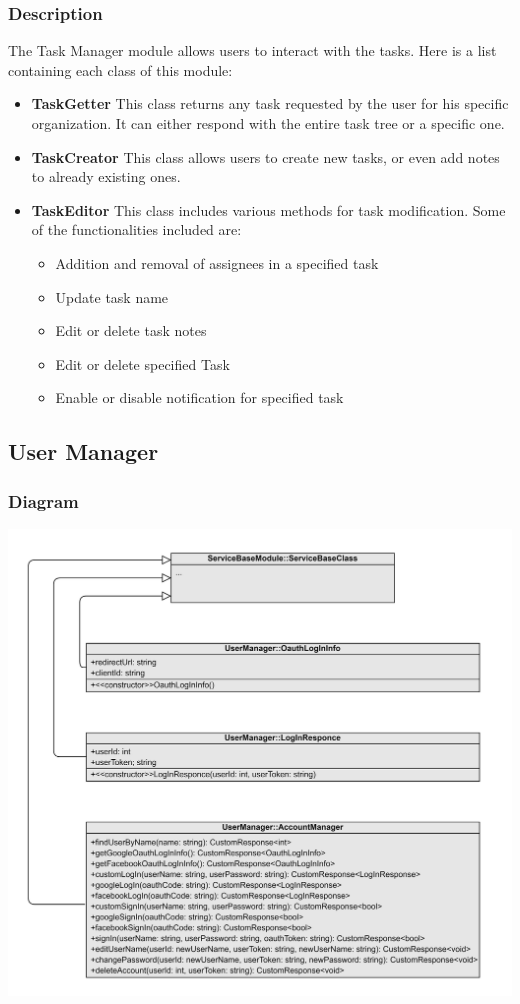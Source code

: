 \documentclass{article}
\begin{document}
\subsubsection{Description}
The Task Manager module allows users to interact with the tasks. Here is a list containing each class of this module:
\begin{itemize}
    \item \textbf{TaskGetter}
    This class returns any task requested by the user for his specific organization. It can either respond with the entire task tree or a specific one.
    \item \textbf{TaskCreator}
    This class allows users to create new tasks, or even add notes to already existing ones.
    \item \textbf{TaskEditor}
    This class includes various methods for task modification. Some of the functionalities included are:
    \begin{itemize}
        \item Addition and removal of assignees in a specified task
        \item Update task name
        \item Edit or delete task notes
        \item Edit or delete specified Task
        \item Enable or disable notification for specified task
    \end{itemize}
\end{itemize}
\subsection{User Manager}

\subsubsection{Diagram}

\includegraphics[width=\textwidth,height=\textheight,keepaspectratio]{images/class_diagram/user_manager.jpg}
\end{document}
